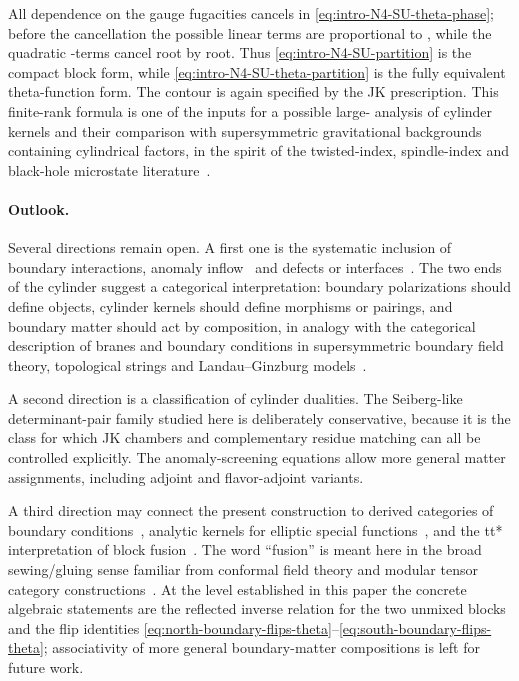 \documentclass[11pt,a4paper]{article}
\makeatletter
\numberwithin{equation}{section}
\theoremstyle{plain}
\theoremstyle{definition}
\theoremstyle{remark}
\newcounter{mathrecordid}
\newcommand{\mathboxbegin}[1]{%
  \stepcounter{mathrecordid}%
  \immediate\write\mathrecords{\themathrecordid,#1}%
  \special{pdf:bann << /Type /Annot /Subtype /Link /Border [0 0 0]
    /MathBoxID \themathrecordid /F 2
    /A << /S /URI /URI (urn:mathbox:\themathrecordid) >> >>}}
\newcommand{\mathboxinlineplain}[1]{$#1$}
\newcommand{\mathboxinline}[1]{%
  $\mathboxbegin{inline}#1\special{pdf:eann}$}
\newcommand{\recordmath}{%
  \ifmeasuring@\expandafter\mathboxinlineplain
  \else\expandafter\mathboxinline\fi}
\makeatother
\begin{document}
All dependence on the gauge fugacities cancels in \eqref{eq:intro-N4-SU-theta-phase}; before the cancellation the possible linear terms are proportional to \recordmath{\sum_{a\neq b}u_{ab}=0}, while the quadratic \recordmath{u_{ab}}-terms cancel root by root.  Thus \eqref{eq:intro-N4-SU-partition} is the compact block form, while \eqref{eq:intro-N4-SU-theta-partition} is the fully equivalent theta-function form.
The contour is again specified by the JK prescription. This finite-rank formula is one of the inputs for a possible large-\recordmath{N} analysis of cylinder kernels and their comparison with supersymmetric gravitational backgrounds containing cylindrical factors, in the spirit of the twisted-index, spindle-index and black-hole microstate literature~\cite{Hosseini:2016tor,Hosseini:2019lkt,Hong:2018viz,Inglese:2023wky,Colombo:2024mts}.

 

\paragraph{Outlook.}

Several directions remain open.  A first one is the systematic inclusion of     boundary interactions, anomaly inflow~\cite{Callan:1984sa} and defects or interfaces~\cite{Dimofte:2017tpi}.  The two ends of the cylinder suggest a categorical interpretation: boundary polarizations should define objects, cylinder kernels should define morphisms or pairings, and boundary matter should act by composition, in analogy with the categorical description of branes and boundary conditions in supersymmetric boundary field theory, topological strings and Landau--Ginzburg models~\cite{Gaiotto:2008sa,Douglas:2000gi,Kapustin:2002bi,Herbst:2008jq}.

A second direction is a classification of cylinder dualities.  The Seiberg-like determinant-pair family studied here is deliberately conservative, because it is the class for which JK chambers and complementary residue matching can all be controlled explicitly.  The anomaly-screening equations allow more general matter assignments, including adjoint and flavor-adjoint variants.   

A third direction   may connect the present construction to derived categories of boundary conditions~\cite{Douglas:2000gi,Kapustin:2002bi,Herbst:2008jq}, analytic kernels for elliptic special functions~\cite{Felder:1999mq,Narukawa:2003}, and the tt* interpretation of block fusion~\cite{Cecotti:1991me,Cecotti:2013mba}.  The word ``fusion'' is meant here in the broad sewing/gluing sense familiar from conformal field theory and modular tensor category constructions~\cite{Moore:1988qv,Fuchs:2002cm}.  At the level established in this paper the concrete algebraic statements are the reflected inverse relation for the two unmixed blocks and the flip identities \eqref{eq:north-boundary-flips-theta}--\eqref{eq:south-boundary-flips-theta}; associativity of more general boundary-matter compositions is left for future work.
\end{document}
